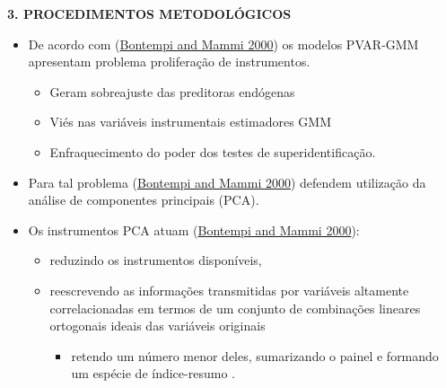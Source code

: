 \documentclass[
  ignorenonframetext,
  aspectratio=169,
  ignorenonframetext]{beamer}
\providecommand{\tightlist}{%
  \setlength{\itemsep}{0pt}\setlength{\parskip}{0pt}}
\begin{document}
\begin{frame}{\textbf{3. PROCEDIMENTOS METODOLÓGICOS}}
\protect\hypertarget{procedimentos-metodoluxf3gicos-8}{}
\begin{itemize}
\item
  De acordo com (\protect\hyperlink{ref-bontempi:2015}{Bontempi and
  Mammi 2000}) os modelos PVAR-GMM apresentam problema proliferação de
  instrumentos.

  \begin{itemize}
  \tightlist
  \item
    Geram sobreajuste das preditoras endógenas
  \item
    Viés nas variáveis instrumentais estimadores GMM
  \item
    Enfraquecimento do poder dos testes de superidentificação.
  \end{itemize}
\item
  Para tal problema (\protect\hyperlink{ref-bontempi:2015}{Bontempi and
  Mammi 2000}) defendem utilização da análise de componentes principais
  (PCA).
\item
  Os instrumentos PCA atuam
  (\protect\hyperlink{ref-bontempi:2015}{Bontempi and Mammi 2000}):

  \begin{itemize}
  \tightlist
  \item
    reduzindo os instrumentos disponíveis,
  \item
    reescrevendo as informações transmitidas por variáveis altamente
    correlacionadas em termos de um conjunto de combinações lineares
    ortogonais ideais das variáveis originais

    \begin{itemize}
    \tightlist
    \item
      retendo um número menor deles, sumarizando o painel e formando um
      espécie de índice-resumo .
    \end{itemize}
  \end{itemize}
\end{itemize}
\end{frame}
\end{document}
